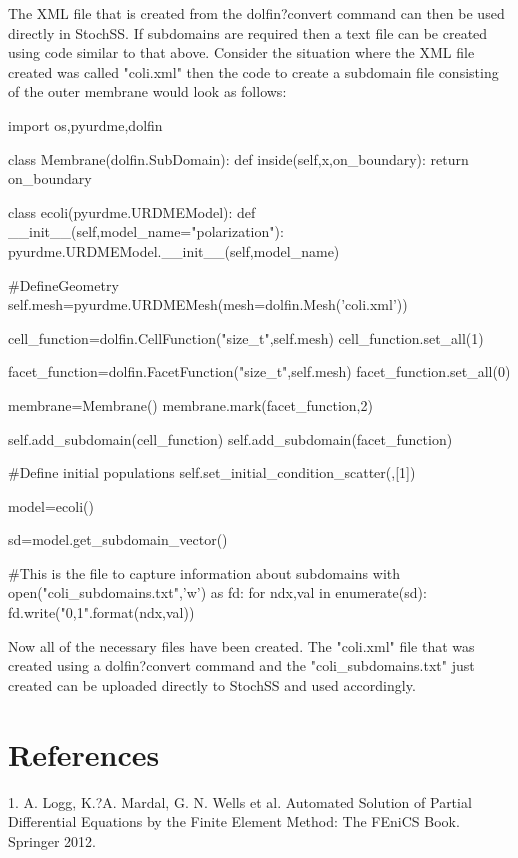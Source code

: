 The XML file that is created from the dolfin?convert command can then be used directly in StochSS. If subdomains are
required then a text file can be created using code similar to that above. Consider the situation where the XML file created
was called "coli.xml" then the code to create a subdomain file consisting of the outer membrane would look as follows:

\begin{ipythonnb}
import os,pyurdme,dolfin
\end{ipythonnb}

\begin{ipythonnb}
class Membrane(dolfin.SubDomain):
	def inside(self,x,on_boundary):
	return on_boundary
\end{ipythonnb}

\begin{ipythonnb}
class ecoli(pyurdme.URDMEModel):
	def __init__(self,model_name="polarization"):
		pyurdme.URDMEModel.__init__(self,model_name)
		
		\#DefineGeometry
		self.mesh=pyurdme.URDMEMesh(mesh=dolfin.Mesh('coli.xml'))

		cell_function=dolfin.CellFunction("size_t",self.mesh)
		cell_function.set_all(1)

		facet_function=dolfin.FacetFunction("size_t",self.mesh)
		facet_function.set_all(0)

		membrane=Membrane()
		membrane.mark(facet_function,2)

		self.add_subdomain(cell_function)
		self.add_subdomain(facet_function)

		\#Define initial populations
		self.set_initial_condition_scatter({},[1])
\end{ipythonnb}

\begin{ipythonnb}
model=ecoli()
\end{ipythonnb}

\begin{ipythonnb}
sd=model.get_subdomain_vector()
\end{ipythonnb}

\begin{ipythonnb}
\#This is the file to capture information about subdomains
with open("coli_subdomains.txt",'w') as fd:
	for ndx,val in enumerate(sd):
		fd.write("{0},{1}\n".format(ndx,val))
\end{ipythonnb}

Now all of the necessary files have been created. The "coli.xml" file that was created using a dolfin?convert command and
the "coli\_subdomains.txt" just created can be uploaded directly to StochSS and used accordingly.

\section{References}

1. A. Logg, K.?A. Mardal, G. N. Wells et al. Automated Solution of Partial Differential Equations by the Finite Element Method: The FEniCS Book. Springer 2012.

